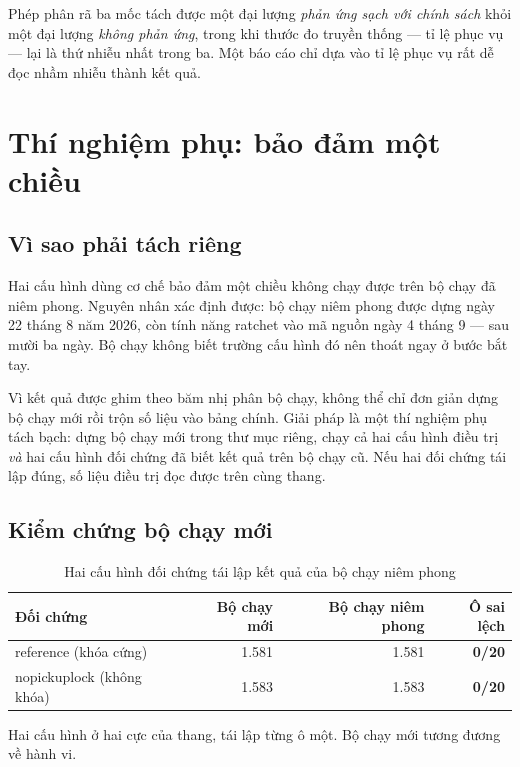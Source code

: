 Phép phân rã ba mốc tách được một đại lượng \emph{phản ứng sạch với chính sách} khỏi một đại
lượng \emph{không phản ứng}, trong khi thước đo truyền thống --- tỉ lệ phục vụ --- lại là thứ
nhiễu nhất trong ba. Một báo cáo chỉ dựa vào tỉ lệ phục vụ rất dễ đọc nhầm nhiễu thành kết quả.

\section{Thí nghiệm phụ: bảo đảm một chiều}
\label{muc:ratchet}

\subsection{Vì sao phải tách riêng}

Hai cấu hình dùng cơ chế bảo đảm một chiều không chạy được trên bộ chạy đã niêm phong. Nguyên
nhân xác định được: bộ chạy niêm phong được dựng ngày 22 tháng 8 năm 2026, còn tính năng ratchet
vào mã nguồn ngày 4 tháng 9 --- sau mười ba ngày. Bộ chạy không biết trường cấu hình đó nên
thoát ngay ở bước bắt tay.

Vì kết quả được ghim theo băm nhị phân bộ chạy, không thể chỉ đơn giản dựng bộ chạy mới rồi trộn
số liệu vào bảng chính. Giải pháp là một thí nghiệm phụ tách bạch: dựng bộ chạy mới trong thư
mục riêng, chạy cả hai cấu hình điều trị \emph{và} hai cấu hình đối chứng đã biết kết quả trên
bộ chạy cũ. Nếu hai đối chứng tái lập đúng, số liệu điều trị đọc được trên cùng thang.

\subsection{Kiểm chứng bộ chạy mới}

\begin{table}[htbp]
\centering
\caption{Hai cấu hình đối chứng tái lập kết quả của bộ chạy niêm phong}
\label{bang:doichung}
\small
\begin{tabular}{@{}lrrr@{}}
\toprule
\textbf{Đối chứng} & \textbf{Bộ chạy mới} & \textbf{Bộ chạy niêm phong} & \textbf{Ô sai lệch}\\
\midrule
reference (khóa cứng) & 1.581 & 1.581 & \textbf{0/20}\\
nopickuplock (không khóa) & 1.583 & 1.583 & \textbf{0/20}\\
\bottomrule
\end{tabular}
\end{table}

Hai cấu hình ở hai cực của thang, tái lập từng ô một. Bộ chạy mới tương đương về hành vi.

